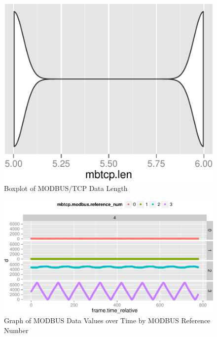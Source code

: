 \documentclass[11pt,]{article}
\begin{document}
\begin{figure}

{\centering \includegraphics{thesis_files/figure-latex/unnamed-chunk-25-1} 

}

\caption{Boxplot of MODBUS/TCP Data Length}\label{fig:unnamed-chunk-25}
\end{figure}

\clearpage

\begin{figure}

{\centering \includegraphics{thesis_files/figure-latex/unnamed-chunk-26-1} 

}

\caption{Graph of MODBUS Data Values over Time by MODBUS  Reference Number}\label{fig:unnamed-chunk-26}
\end{figure}
\end{document}
